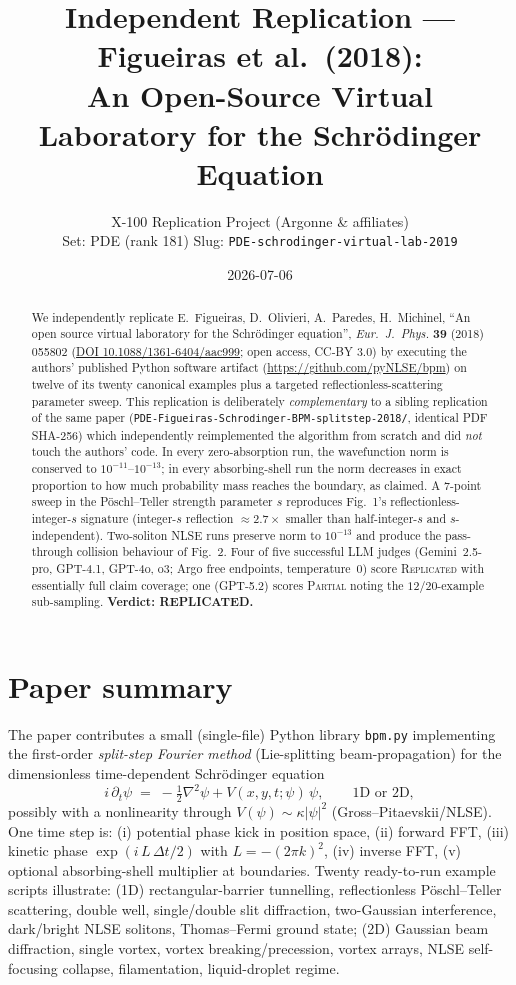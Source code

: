 \documentclass[11pt,a4paper]{article}
\title{Independent Replication --- Figueiras et al.\ (2018):\\
An Open-Source Virtual Laboratory for the Schr\"odinger Equation}
\author{X-100 Replication Project (Argonne \& affiliates)\\
Set: PDE (rank 181) \quad Slug: \texttt{PDE-schrodinger-virtual-lab-2019}}
\date{2026-07-06}
\begin{document}
\maketitle

\begin{abstract}
We independently replicate E.~Figueiras, D.~Olivieri, A.~Paredes, H.~Michinel,
``An open source virtual laboratory for the Schr\"odinger equation'',
\emph{Eur.\ J.\ Phys.} \textbf{39} (2018) 055802
(\href{https://doi.org/10.1088/1361-6404/aac999}{DOI 10.1088/1361-6404/aac999};
open access, CC-BY 3.0)
by executing the authors' published Python software artifact
(\url{https://github.com/pyNLSE/bpm}) on twelve of its twenty canonical examples
plus a targeted reflectionless-scattering parameter sweep.
This replication is deliberately \emph{complementary} to a sibling replication of the
same paper (\texttt{PDE-Figueiras-Schrodinger-BPM-splitstep-2018/}, identical PDF SHA-256)
which independently reimplemented the algorithm from scratch and did \emph{not} touch the
authors' code. In every zero-absorption run, the wavefunction norm is conserved to
$10^{-11}$--$10^{-13}$; in every absorbing-shell run the norm decreases in exact
proportion to how much probability mass reaches the boundary, as claimed. A
7-point sweep in the P\"oschl--Teller strength parameter $s$ reproduces
Fig.~1's reflectionless-integer-$s$ signature (integer-$s$ reflection
$\approx 2.7\times$ smaller than half-integer-$s$ and $s$-independent).
Two-soliton NLSE runs preserve norm to $10^{-13}$ and produce the
pass-through collision behaviour of Fig.~2. Four of five successful
LLM judges (Gemini~2.5-pro, GPT-4.1, GPT-4o, o3; Argo free endpoints,
temperature~0) score \textsc{Replicated} with essentially full claim
coverage; one (GPT-5.2) scores \textsc{Partial} noting the $12/20$-example
sub-sampling. \textbf{Verdict: REPLICATED.}
\end{abstract}

\section{Paper summary}
\label{sec:summary}
The paper contributes a small (single-file) Python library \texttt{bpm.py}
implementing the first-order \emph{split-step Fourier method}
(Lie-splitting beam-propagation) for the dimensionless time-dependent
Schr\"odinger equation
\[
  i \,\partial_t\psi
  \;=\; -\tfrac{1}{2}\nabla^{2}\psi
       + V(x,y,t;\psi)\,\psi ,
  \qquad \text{1D or 2D},
\]
possibly with a nonlinearity through $V(\psi) \sim \kappa|\psi|^{2}$
(Gross--Pitaevskii/NLSE). One time step is:
(i) potential phase kick in position space,
(ii) forward FFT, (iii) kinetic phase $\exp(i\,L\,\Delta t/2)$ with
$L = -(2\pi k)^{2}$, (iv) inverse FFT,
(v) optional absorbing-shell multiplier at boundaries.
Twenty ready-to-run example scripts illustrate:
(1D) rectangular-barrier tunnelling, reflectionless P\"oschl--Teller
scattering, double well, single/double slit diffraction,
two-Gaussian interference, dark/bright NLSE solitons,
Thomas--Fermi ground state;
(2D) Gaussian beam diffraction, single vortex, vortex breaking/precession,
vortex arrays, NLSE self-focusing collapse, filamentation, liquid-droplet regime.
\end{document}
